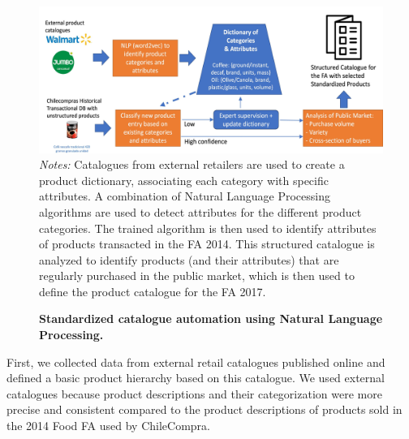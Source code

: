 \begin{figure}
    \caption{\textbf{Standardized catalogue automation using Natural Language Processing.} }
    \includegraphics[scale=0.5]{imagenes/procurement/Catalogue_automation.jpg}
    \small{\textit{Notes:} Catalogues from external retailers are used to create a product dictionary, associating each category with specific attributes. A combination of Natural Language Processing algorithms are used to detect attributes for the different product categories. The trained algorithm is then used to identify attributes of products transacted in the FA 2014. This structured catalogue is analyzed to identify products (and their attributes) that are regularly purchased in the public market, which is then used to define the product catalogue for the FA 2017.}
    \label{fig:catalogue_automation}
\end{figure}

First, we collected data from external retail catalogues published online and defined a basic product hierarchy based on this catalogue. We used external catalogues because product descriptions and their categorization were more precise and consistent compared to the product descriptions of products sold in the 2014 Food FA used by ChileCompra. 

